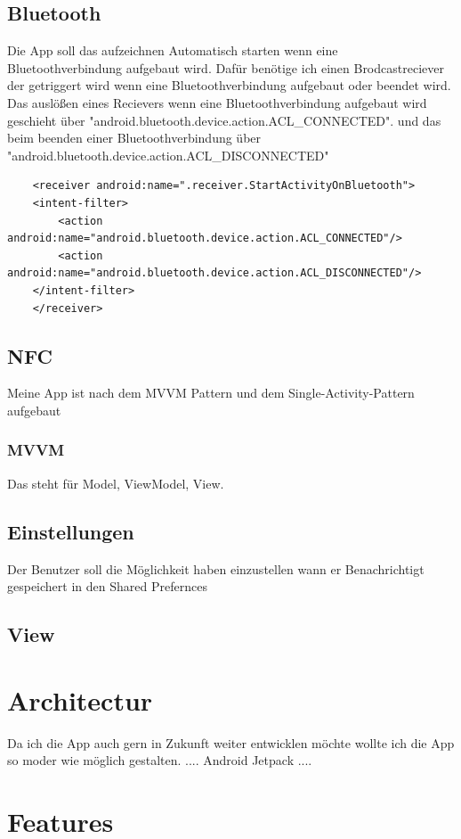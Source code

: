 \documentclass[a4paper]{article}
\begin{document}
\subsection{Bluetooth}
Die App soll das aufzeichnen Automatisch starten wenn eine Bluetoothverbindung aufgebaut wird.
Dafür benötige ich einen Brodcastreciever der getriggert wird wenn eine Bluetoothverbindung aufgebaut oder beendet wird.
Das auslößen eines Recievers wenn eine Bluetoothverbindung aufgebaut wird geschieht über "android.bluetooth.device.action.ACL_CONNECTED".
und das beim beenden einer Bluetoothverbindung über "android.bluetooth.device.action.ACL_DISCONNECTED"  

\begin{verbatim}
	<receiver android:name=".receiver.StartActivityOnBluetooth">
	<intent-filter>
		<action android:name="android.bluetooth.device.action.ACL_CONNECTED"/>
		<action android:name="android.bluetooth.device.action.ACL_DISCONNECTED"/>
	</intent-filter>
	</receiver>
\end{verbatim}

\subsection{NFC}
Meine App ist nach dem MVVM Pattern und dem Single-Activity-Pattern aufgebaut

\subsubsection{MVVM}
Das steht für Model, ViewModel, View. 

\subsection{Einstellungen}
Der Benutzer soll die Möglichkeit haben einzustellen wann er Benachrichtigt
gespeichert in den Shared Prefernces

\subsection{View}

\section{Architectur}
Da ich die App auch gern in Zukunft weiter entwicklen möchte wollte ich die App so moder wie möglich gestalten.
....
Android Jetpack
....


\section{Features}
\end{document}
